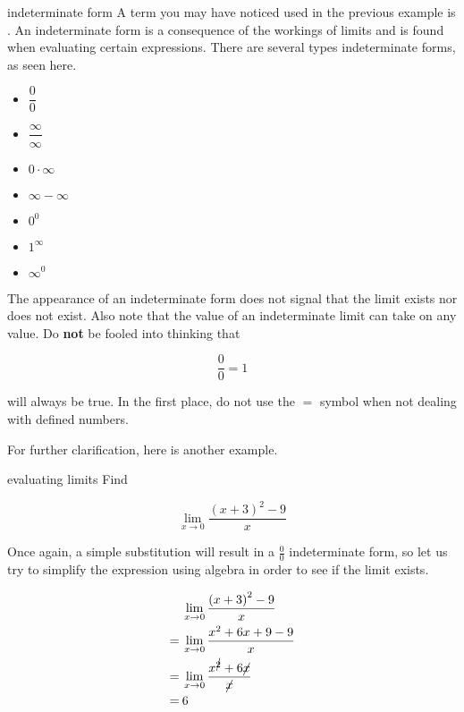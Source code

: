 \begin{definition}{indeterminate form}
    A term you may have noticed used in the previous example is . An indeterminate form is a consequence of the workings of limits and is found when evaluating certain expressions. There are several types indeterminate forms, as seen here.
    
    \begin{multicols}{3}
    \begin{itemize}
        \item \( \dfrac{0}{0} \)
        \item \( \dfrac{\infty}{\infty} \)
        \item \( 0 \cdot \infty \)
        \item \( \infty - \infty \)
        \item \( 0^0 \)
        \item \( 1^\infty \)
        \item \( \infty^0 \)
    \end{itemize}
    \end{multicols}
    
    The appearance of an indeterminate form does not signal that the limit exists nor does not exist. Also note that the value of an indeterminate limit can take on any value. Do \textbf{\color{tipfg}not} be fooled into thinking that
    
    \[ \dfrac{0}{0} = 1 \]
    
    will always be true. In the first place, do not use the \( = \) symbol when not dealing with defined numbers.
\end{definition}

For further clarification, here is another example.

\begin{example}{evaluating limits}
    Find
    
    \[ \lim_{x \to 0} \dfrac{\left( x + 3 \right)^2 - 9}{x} \]
    
    Once again, a simple substitution will result in a \( \frac{0}{0} \) indeterminate form, so let us try to simplify the expression using algebra in order to see if the limit exists.
    
    \begin{align}
        &\lim_{x \to 0} \dfrac{\left( x + 3 \right)^2 - 9}{x} \\
        = \> &\lim_{x \to 0} \dfrac{x^2 + 6x + 9 - 9}{x} \\
        = \> &\lim_{x \to 0} \dfrac{x^{\cancel{2}} + 6\cancel{x}}{\cancel{x}} \\
        = \> &6
    \end{align}
\end{example}

